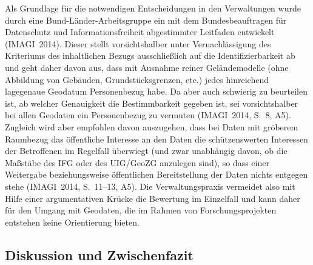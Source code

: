 \documentclass[a4paper,
fontsize=11pt,
oneside,
numbers=noperiodatend,
parskip=half-,
bibliography=totoc,
final
]{scrartcl}
\begin{document}
Als Grundlage für die notwendigen Entscheidungen in den Verwaltungen
wurde durch eine Bund-Länder-Arbeitsgruppe ein mit dem Bundesbeauftragen
für Datenschutz und Informationsfreiheit abgestimmter Leitfaden
entwickelt (IMAGI~2014). Dieser stellt vorsichtshalber unter
Vernachlässigung des Kriteriums des inhaltlichen Bezugs ausschließlich
auf die Identifizierbarkeit ab und geht daher davon aus, dass mit
Ausnahme reiner Geländemodelle (ohne Abbildung von Gebäuden,
Grundstücksgrenzen, etc.) jedes hinreichend lagegenaue Geodatum
Personenbezug habe. Da aber auch schwierig zu beurteilen ist, ab welcher
Genauigkeit die Bestimmbarkeit gegeben ist, sei vorsichtshalber bei
allen Geodaten ein Personenbezug zu vermuten (IMAGI~2014, S.~8, A5).
Zugleich wird aber empfohlen davon auszugehen, dass bei Daten mit
gröberem Raumbezug das öffentliche Interesse an den Daten die
schützenswerten Interessen der Betroffenen im Regelfall überwiegt (und
zwar unabhängig davon, ob die Maßstäbe des IFG oder des UIG/GeoZG
anzulegen sind), so dass einer Weitergabe beziehungsweise öffentlichen
Bereitstellung der Daten nichts entgegen stehe (IMAGI~2014, S.~11--13,
A5). Die Verwaltungspraxis vermeidet also mit Hilfe einer argumentativen
Krücke die Bewertung im Einzelfall und kann daher für den Umgang mit
Geodaten, die im Rahmen von Forschungsprojekten entstehen keine
Orientierung bieten.

\hypertarget{diskussion-und-zwischenfazit}{%
\subsection{Diskussion und Zwischenfazit}\label{diskussion-und-zwischenfazit}}
\end{document}

